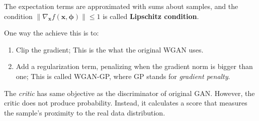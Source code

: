 \documentclass{article}
\begin{document}
            The expectation terms are approximated with sums about samples, and the condition $\|\nabla_{\textbf{x}}f(\textbf{x}, \bm{\phi})\| \leq 1$
            is called \textbf{Lipschitz condition}.

            One way the achieve this is to:
            \begin{enumerate}
                \item Clip the gradient; This is the what the original WGAN uses.
                \item Add a regularization term, penalizing when the gradient norm is bigger than one; This is called WGAN-GP,
                    where GP stands for \emph{gradient penalty}.
            \end{enumerate}

            The \emph{critic} has same objective as the discriminator of original GAN. However, the critic
            does not produce probability. Instead, it calculates a score that measures the sample's proximity to
            the real data distribution.
\end{document}
